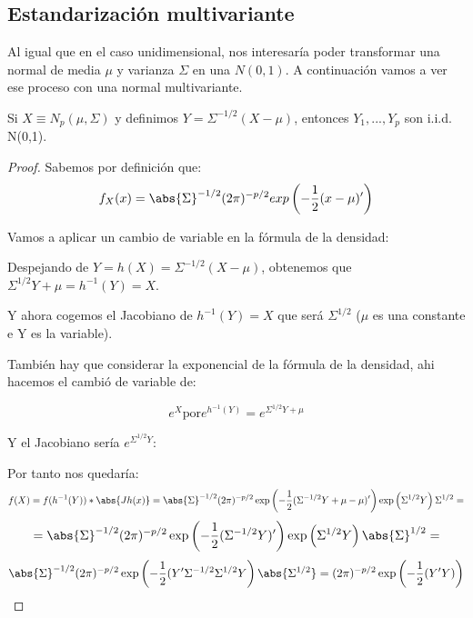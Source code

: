 \subsection{Estandarización multivariante}


Al igual que en el caso unidimensional, nos interesaría poder transformar una normal de media $μ$ y varianza $Σ$ en una $N(0,1)$. A continuación vamos a ver ese proceso con una normal multivariante.


\begin{prop} Si $X \equiv N_p(\mu, \Sigma)$ y definimos $Y = \Sigma^{-1/2}(X-\mu)$, entonces $Y_1,...,Y_p$ son i.i.d. N(0,1).\end{prop}

\begin{proof}
Sabemos por definición que:
\[
f_X(x)=\abs{\Sigma}^{-1/2}(2\pi)^{-p/2} exp \left( -\frac{1}{2}(x-\mu)' \right)
\]

Vamos a aplicar un cambio de variable en la fórmula de la densidad:

Despejando de $Y = h(X)= \Sigma^{-1/2}(X-\mu)$, obtenemos que $\Sigma^{1/2}Y+\mu=h^{-1}(Y)=X$.

Y ahora cogemos el Jacobiano de $h^{-1}(Y)=X$ que será $\Sigma^{1/2}$ ($\mu$ es una constante e Y es la variable).

También hay que considerar la exponencial de la fórmula de la densidad, ahi hacemos el cambió de variable de:

$$e^X \text{por} e^{h^{-1}(Y)}=e^{\Sigma^{1/2}Y+\mu}$$

Y el Jacobiano sería $e^{\Sigma^{1/2}Y}$:


Por tanto nos quedaría:
\[
f(X) = f(h^{-1}(Y))*\abs{Jh(x)} = \abs{\Sigma}^{-1/2}(2 \pi)^{-p/2} \exp\left(-\frac{1}{2}(\Sigma^{-1/2}Y+\mu-\mu)'  \right) \exp\left( \Sigma^{1/2}Y \right) \Sigma^{1/2}  =
\]
\[
= \abs{\Sigma}^{-1/2}(2 \pi)^{-p/2} \exp\left(-\frac{1}{2}(\Sigma^{-1/2}Y)' \right) \exp\left( \Sigma^{1/2}Y \right) \abs{\Sigma}^{1/2} =
\]
\[
\abs{\Sigma}^{-1/2}(2 \pi)^{-p/2} \exp\left(-\frac{1}{2}(Y'\Sigma^{-1/2}\Sigma^{1/2}Y \right) \abs{\Sigma^{1/2}} = (2 \pi)^{-p/2} \exp\left(-\frac{1}{2}(Y'Y) \right)
\]
\end{proof}


